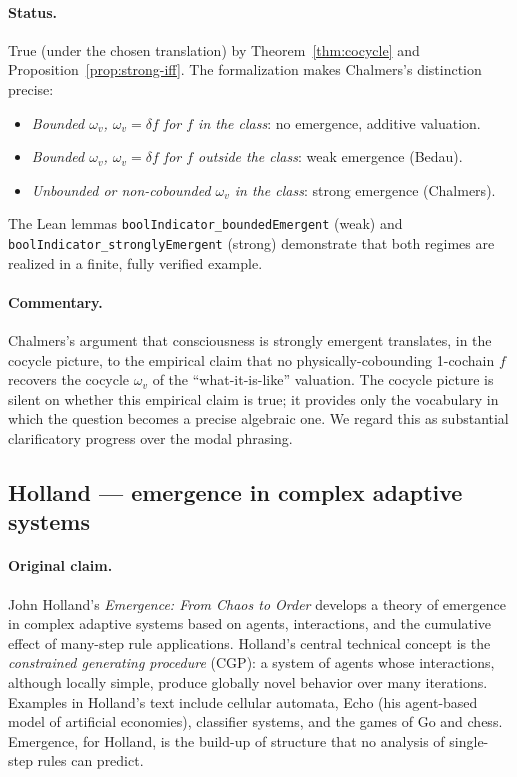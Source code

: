\paragraph{Status.} True (under the chosen translation) by
Theorem~\ref{thm:cocycle} and Proposition~\ref{prop:strong-iff}. The
formalization makes Chalmers's distinction precise:
\begin{itemize}
\item \emph{Bounded $\omega_v$, $\omega_v = \delta f$ for $f$ in the class}:
no emergence, additive valuation.
\item \emph{Bounded $\omega_v$, $\omega_v = \delta f$ for $f$ outside the
class}: weak emergence (Bedau).
\item \emph{Unbounded or non-cobounded $\omega_v$ in the class}: strong
emergence (Chalmers).
\end{itemize}
The Lean lemmas \texttt{boolIndicator\_boundedEmergent} (weak) and
\texttt{boolIndicator\_stronglyEmergent} (strong) demonstrate that both
regimes are realized in a finite, fully verified example.

\paragraph{Commentary.} Chalmers's argument that consciousness is strongly
emergent translates, in the cocycle picture, to the empirical claim that no
physically-cobounding 1-cochain $f$ recovers the cocycle $\omega_v$ of the
``what-it-is-like'' valuation. The cocycle picture is silent on whether
this empirical claim is true; it provides only the vocabulary in which the
question becomes a precise algebraic one. We regard this as substantial
clarificatory progress over the modal phrasing.

\subsection{Holland --- emergence in complex adaptive systems}
\label{sec:zoo:holland}

\paragraph{Original claim.} John Holland's \emph{Emergence: From Chaos to
Order} \cite{Holland1998} develops a theory of emergence in complex adaptive
systems based on agents, interactions, and the cumulative effect of
many-step rule applications. Holland's central technical concept is the
\emph{constrained generating procedure} (CGP): a system of agents whose
interactions, although locally simple, produce globally novel behavior over
many iterations. Examples in Holland's text include cellular automata,
Echo (his agent-based model of artificial economies), classifier
systems, and the games of Go and chess. Emergence, for Holland, is the
build-up of structure that no analysis of single-step rules can predict.

